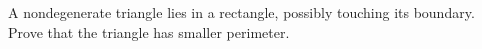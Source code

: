 A nondegenerate triangle lies in a rectangle, possibly touching its boundary. Prove that the triangle has smaller perimeter.
